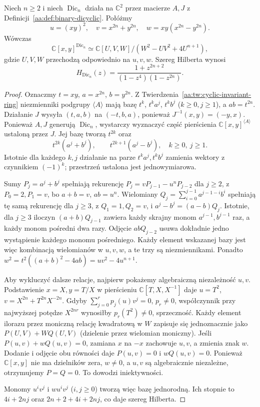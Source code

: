 \begin{twierdzenie}
\label{aa:tw:dicyclic-invariant-ring}
Niech $n\ge2$ i niech $\operatorname{Dic}_n$
działa na $\mathbb C^2$ przez macierze $A,J$
z Definicji~\ref{aa:def:binary-dicyclic}.
Połóżmy
\[
 u=(xy)^2,\quad v=x^{2n}+y^{2n},\quad
 w=xy(x^{2n}-y^{2n}).
\]
Wówczas
\[
 \mathbb C[x,y]^{\operatorname{Dic}_n}\simeq
 \mathbb C[U,V,W]/(W^2-UV^2+4U^{n+1}),
\]
gdzie $U,V,W$ przechodzą odpowiednio na $u,v,w$.
Szereg Hilberta wynosi
\[
 H_{\operatorname{Dic}_n}(z)
 =\frac{1+z^{2n+2}}{(1-z^4)(1-z^{2n})}.
\]
\end{twierdzenie}
\begin{proof}
Oznaczmy $t=xy$, $a=x^{2n}$, $b=y^{2n}$.
Z Twierdzenia~\ref{aa:tw:cyclic-invariant-ring}
niezmienniki podgrupy $\langle A\rangle$ mają bazę
$t^k$, $t^ka^j$, $t^kb^j$ ($k\ge0,j\ge1$),
a $ab=t^{2n}$. Działanie $J$ wysyła
$(t,a,b)$ na $(-t,b,a)$, ponieważ $J^{-1}(x,y)=(-y,x)$.
Ponieważ $A,J$ generują $\operatorname{Dic}_n$,
wystarczy wyznaczyć część pierścienia
$\mathbb C[x,y]^{\langle A\rangle}$ ustaloną przez $J$.
Jej bazę tworzą $t^{2k}$ oraz
\[
 t^{2k}(a^j+b^j),\qquad
 t^{2k+1}(a^j-b^j),\quad k\ge0,\ j\ge1.
\]
Istotnie dla każdego $k,j$ działanie na parze
$t^ka^j,t^kb^j$ zamienia wektory z czynnikiem $(-1)^k$;
przestrzeń ustalona jest jednowymiarowa.

Sumy $P_j=a^j+b^j$ spełniają rekurencję
$P_j=vP_{j-1}-u^nP_{j-2}$ dla $j\ge2$,
z $P_0=2,P_1=v$, bo $a+b=v$, $ab=u^n$.
Wielomiany $Q_j=\sum_{i=0}^{j-1}a^{j-1-i}b^i$
spełniają tę samą rekurencję dla $j\ge3$,
z $Q_1=1,Q_2=v$, i $a^j-b^j=(a-b)Q_j$.
Istotnie, dla $j\ge3$ iloczyn $(a+b)Q_{j-1}$
zawiera każdy skrajny monom $a^{j-1},b^{j-1}$
raz, a każdy monom pośredni dwa razy.
Odjęcie $abQ_{j-2}$ usuwa dokładnie jedno
wystąpienie każdego monomu pośredniego.
Każdy element wskazanej bazy jest więc kombinacją
wielomianów w $u,v,w$, a te trzy są niezmiennikami.
Ponadto
$w^2=t^2((a+b)^2-4ab)=uv^2-4u^{n+1}$.

Aby wykluczyć dalsze relacje, najpierw pokażemy
algebraiczną niezależność $u,v$.
Podstawienie $x=X,y=T/X$ w pierścieniu
$\mathbb C[T,X,X^{-1}]$ daje
$u=T^2$, $v=X^{2n}+T^{2n}X^{-2n}$.
Gdyby $\sum_{j=0}^r p_j(u)v^j=0$, $p_r\ne0$,
współczynnik przy najwyższej potędze $X^{2nr}$
wynosiłby $p_r(T^2)\ne0$, sprzeczność.
Każdy element ilorazu przez moniczną relację
kwadratową w $W$ zapisuje się jednoznacznie jako
$P(U,V)+WQ(U,V)$ (dzielenie przez wielomian moniczny).
Jeśli $P(u,v)+wQ(u,v)=0$, zamiana $x$ na $-x$
zachowuje $u,v$, a zmienia znak $w$.
Dodanie i odjęcie obu równości daje
$P(u,v)=0$ i $wQ(u,v)=0$.
Ponieważ $\mathbb C[x,y]$ nie ma dzielników zera,
$w\ne0$, a $u,v$ są algebraicznie niezależne,
otrzymujemy $P=Q=0$. To dowodzi iniektywności.

Monomy $u^iv^j$ i $wu^iv^j$ ($i,j\ge0$)
tworzą więc bazę jednorodną. Ich stopnie to
$4i+2nj$ oraz $2n+2+4i+2nj$, co daje szereg Hilberta.
\end{proof}

